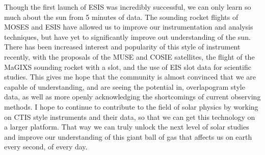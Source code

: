 Though the first launch of ESIS was incredibly successful, we can only learn so much about the sun from 5 minutes of data.
The sounding rocket flights of MOSES and ESIS have allowed us to improve our instrumentation and analysis techniques, but have yet to significantly improve out understanding of the sun.
There has been increased interest and popularity of this style of instrument recently, with the proposals of the MUSE\citep{MUSE} and COSIE\citep{winebarger2019} satellites, the flight of the MaGIXS\citep{MaGIXS} sounding rocket with a slot, and the use of EIS slot data for scientific studies\citep{harra2017,harra2020}.
This gives me hope that the community is almost convinced that we are capable of understanding, and are seeing the potential in, overlapogram style data, as well as more openly acknowledging the shortcomings of current observing methods.
I hope to continue to contribute to the field of solar physics by working on CTIS style instruments and their data, so that we can get this technology on a larger platform.
That way we can truly unlock the next level of solar studies and improve our understanding of this giant ball of gas that affects us on earth every second, of every day.



 